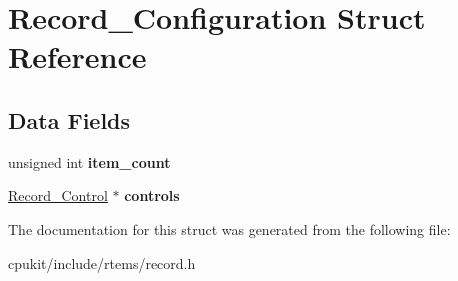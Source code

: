\hypertarget{structRecord__Configuration}{}\section{Record\+\_\+\+Configuration Struct Reference}
\label{structRecord__Configuration}
\subsection*{Data Fields}
\begin{DoxyCompactItemize}
\item 
\mbox{\label{structRecord__Configuration_a9ab3582a7aed4c4e80c895e11b50d200}} 
unsigned int {\bfseries item\+\_\+count}
\item 
\mbox{\label{structRecord__Configuration_a20828a2d60ed6c29a32e38f021829a54}} 
\mbox{\hyperlink{structRecord__Control}{Record\+\_\+\+Control}} $\ast$ {\bfseries controls}
\end{DoxyCompactItemize}


The documentation for this struct was generated from the following file\+:\begin{DoxyCompactItemize}
\item 
cpukit/include/rtems/record.\+h\end{DoxyCompactItemize}

